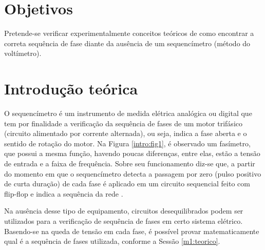 \documentclass[a4paper,12pt,oneside,openany,table,xcdraw]{article}
\begin{document}
\newcommand{\thedepartment}{Faculdade de Engenharia Elétrica}
\newcommand{\thecourse}{FEELT}
\newcommand{\thetitle}{VERIFICAÇÃO DA SEQUÊNCIA DE FASES DAS TENSÕES}
\newcommand{\thetype}{Relatório da Disciplina de Experimental de Circuitos Elétricos II}
\newcommand{\theproftitle}{Bacharel em Engenharia Elétrica}
\newcommand{\thestudent}{Lesly Viviane Montúfar Berrios\\
\centering11811ETE001}
\newcommand{\theadvisor}{Prof. Wellington Maycon Santos Bernardes}
\newcommand{\thecity}{Uberlândia}

\thispagestyle{empty}


\onehalfspacing
\tableofcontents %
\newpage

\section{Objetivos} %
Pretende-se verificar experimentalmente conceitos teóricos de como encontrar a correta sequência de
fase diante da ausência de um sequencímetro (método do voltímetro).

\section{Introdução teórica} %

O sequencímetro é um instrumento de medida elétrica analógica ou digital que tem por  finalidade a verificação da sequência de fases de um motor trifásico (circuito alimentado por corrente alternada), ou seja, indica a fase aberta e o sentido de rotação do motor. Na Figura \ref{intro:fig1}, é observado um fasímetro, que possui a mesma função, havendo poucas diferenças, entre elas, estão a tensão de entrada e a faixa de frequência. Sobre seu funcionamento diz-se que, a partir do momento em que o sequencímetro detecta a passagem por zero (pulso positivo de curta duração) de cada fase é aplicado em um circuito sequencial feito com flip-flop e indica a sequência da rede \cite{UNIR}.

Na ausência desse tipo de equipamento, circuitos desequilibrados podem ser utilizados para a verificação de sequência de fases em certo sistema elétrico. Basendo-se na queda de tensão em cada fase, é possível provar matematicamente qual é a sequência de fases utilizada, conforme a Sessão \ref{m1:teorico}.
\end{document}
